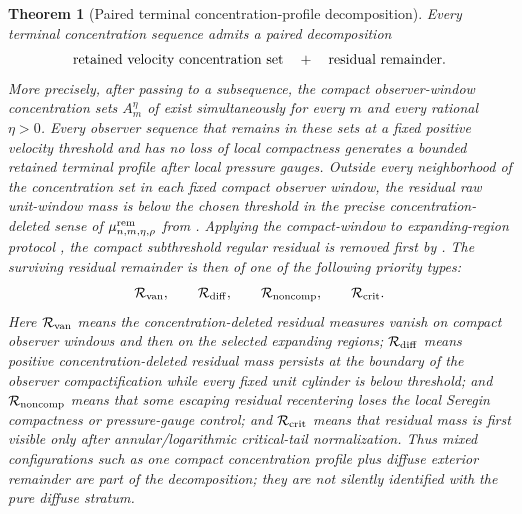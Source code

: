 \documentclass[11pt]{amsart}
\numberwithin{equation}{section}
\theoremstyle{plain}
\newtheorem{theorem}{Theorem}[section]
\theoremstyle{definition}
\theoremstyle{remark}
\begin{document}
\begin{theorem}[Paired terminal concentration-profile decomposition]
\label{thm:terminal-exhaustion-main}
Every terminal concentration sequence admits a paired decomposition
\[
   \hbox{retained velocity concentration set}
   \quad+\quad
   \hbox{residual remainder}.
\]
More precisely, after passing to a subsequence, the compact observer-window
concentration sets \(A_m^\eta\) of  exist
simultaneously for every \(m\) and every rational \(\eta>0\).  Every observer
sequence that remains in these sets at a fixed positive velocity threshold and has no
loss of local compactness generates a bounded retained terminal profile after
local pressure gauges.  Outside every neighborhood of the concentration set in each
fixed compact observer window, the residual raw unit-window mass is below the chosen
threshold in the precise concentration-deleted sense of
\(\mu_{n,m,\eta,\rho}^{\rm rem}\) from
.  Applying the compact-window to
expanding-region protocol
, the compact subthreshold
regular residual is removed first by
.  The surviving residual
remainder is then of one of the following priority types:
\[
   \mathcal R_{\rm van},\qquad
   \mathcal R_{\rm diff},\qquad
   \mathcal R_{\rm noncomp},\qquad
   \mathcal R_{\rm crit}.
\]
Here \(\mathcal R_{\rm van}\) means the concentration-deleted residual measures vanish
on compact observer windows and then on the selected expanding regions;
\(\mathcal R_{\rm diff}\) means positive concentration-deleted residual mass
persists at the boundary of the observer compactification while every fixed
unit cylinder is below threshold; and
\(\mathcal R_{\rm noncomp}\) means that some escaping residual recentering loses
the local Seregin compactness or pressure-gauge control; and
\(\mathcal R_{\rm crit}\) means that residual mass is first visible only after
annular/logarithmic critical-tail normalization.  Thus mixed configurations such
as one compact concentration profile plus diffuse exterior remainder are part of the
decomposition; they are not silently identified with the pure diffuse stratum.
\end{theorem}
\end{document}
